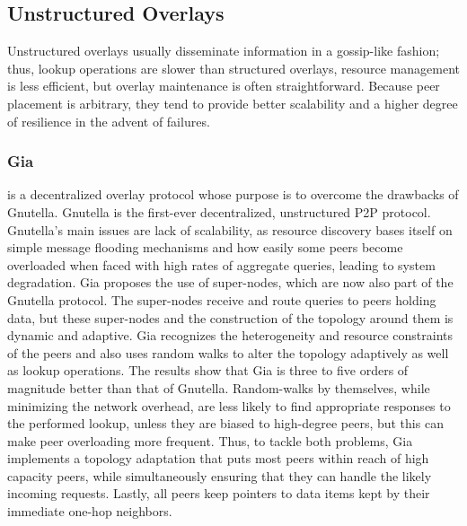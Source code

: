 \documentclass[runningheads]{llncs}
\begin{document}
\subsection{Unstructured Overlays}
Unstructured overlays usually disseminate information in a gossip-like fashion; thus, lookup operations are slower than structured overlays, resource management is less efficient, but overlay maintenance is often straightforward. Because peer placement is arbitrary, they tend to provide better scalability and a higher degree of resilience in the advent of failures.

\subsubsection{Gia} \cite{gia} is a decentralized overlay protocol whose purpose is to overcome the drawbacks of Gnutella. Gnutella is the first-ever decentralized, unstructured P2P protocol. Gnutella's main issues are lack of scalability, as resource discovery bases itself on simple message flooding mechanisms and how easily some peers become overloaded when faced with high rates of aggregate queries, leading to system degradation. Gia proposes the use of super-nodes, which are now also part of the Gnutella protocol. The super-nodes receive and route queries to peers holding data, but these super-nodes and the construction of the topology around them is dynamic and adaptive. Gia recognizes the heterogeneity and resource constraints of the peers and also uses random walks to alter the topology adaptively as well as lookup operations. The results show that Gia is three to five orders of magnitude better than that of Gnutella. Random-walks by themselves, while minimizing the network overhead, are less likely to find appropriate responses to the performed lookup, unless they are biased to high-degree peers, but this can make peer overloading more frequent. Thus, to tackle both problems, Gia implements a topology adaptation that puts most peers within reach of high capacity peers, while simultaneously ensuring that they can handle the likely incoming requests. Lastly, all peers keep pointers to data items kept by their immediate one-hop neighbors.
\end{document}
